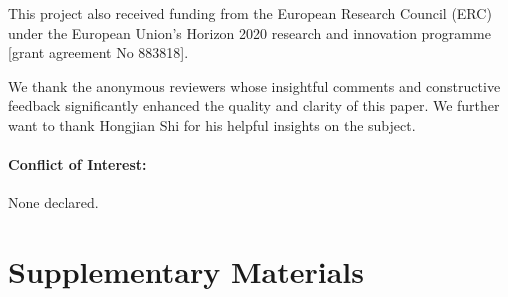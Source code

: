 \documentclass[arxiv]{imsart}
\theoremstyle{plain}
\newcounter{reviewer}
\begin{document}
\noindent This project also received funding from the European Research Council (ERC) under the European Union’s Horizon 2020 research and innovation programme [grant agreement No 883818].





\begin{acks}[Acknowledgments]
    We thank the anonymous reviewers whose insightful comments and constructive feedback significantly enhanced the quality and clarity of this paper. We further want to thank Hongjian Shi for his helpful insights on the subject.\\

    \paragraph{Conflict of Interest:} None declared.
\end{acks}


\clearpage
\newpage
\renewcommand{\thesection}{SM} %
\section*{Supplementary Materials}


\clearpage\newpage

\end{document}
